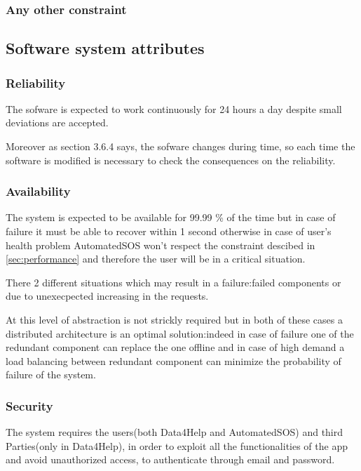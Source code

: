     \subsubsection{Any other constraint}
  \subsection{Software system attributes}

    \subsubsection{Reliability}
      The sofware is expected to work continuously for 24 hours a day despite small deviations are accepted. 

      Moreover as section 3.6.4 says, the sofware changes during time, so each time the software is modified is necessary to check the consequences on the reliability.

    \subsubsection{Availability}

      The system is expected to be available for 99.99 \% of the time but in case of failure it must be able to recover within 1 second otherwise in case of user's health problem AutomatedSOS won't respect the constraint descibed in \ref{sec:performance} and therefore the user will be in a critical situation.

 There 2 different situations which may result in a failure:failed components or due to unexecpected increasing in the requests. 

At this level of abstraction is not strickly required but in both of these cases a distributed architecture is an optimal solution:indeed in case of failure one of the redundant component can replace the one offline and in case of high demand a load balancing between redundant component can minimize the probability of failure of the system.

    \subsubsection{Security}

      The system requires the users(both Data4Help and AutomatedSOS) and third Parties(only in Data4Help), in order to exploit all the functionalities of the app and avoid unauthorized access, to authenticate through email and password.


